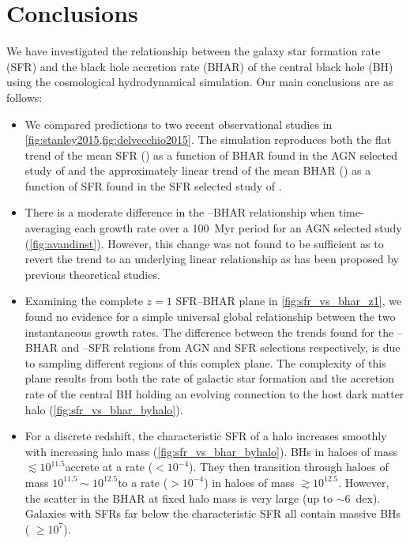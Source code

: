 \section{Conclusions}
\label{sect:conclusions}

We have investigated the relationship between the galaxy star formation rate
(SFR) and the black hole accretion rate (BHAR) of the central black hole (BH)
using the \eagle cosmological hydrodynamical simulation. Our main conclusions
are as follows: 

\begin{itemize}

\item We compared \eagle predictions to two recent observational studies in
\cref{fig:stanley2015,fig:delvecchio2015}. The simulation reproduces both the
flat trend of the mean SFR () as a function of BHAR found in the AGN
selected study of \citet{Stanley2015} and the approximately linear trend of the
mean BHAR () as a function of SFR found in the SFR selected study of
\citet{Delvecchio2015}. 

\item There is a moderate difference in the --BHAR relationship when
time-averaging each growth rate over a 100~Myr period for an AGN selected study
(\cref{fig:avandinst}).  However, this change was not found to be sufficient as
to revert the trend to an underlying linear relationship as has been proposed by
previous theoretical studies.

\item Examining the complete $z=1$ SFR--BHAR plane in
\cref{fig:sfr_vs_bhar_z1}, we found no evidence for a simple universal global
relationship between the two instantaneous growth rates. The difference between
the trends found for the --BHAR and --SFR relations from AGN
and SFR selections respectively, is due to sampling different regions of this
complex plane. The complexity of this plane results from both the rate of
galactic star formation and the accretion rate of the central BH holding an
evolving connection to the host dark matter halo
(\cref{fig:sfr_vs_bhar_byhalo}).

\item For a discrete redshift, the characteristic SFR of a halo increases
smoothly with increasing halo mass (\cref{fig:sfr_vs_bhar_byhalo}). BHs in
haloes of mass  $\lesssim 10^{11.5}$\Msol accrete at a 
rate (\BHAR $< 10^{-4}$\Msolyr).  They then transition through haloes of mass
$10^{11.5} \sim 10^{12.5}$\Msol to a  rate (\BHAR $>
10^{-4}$\Msolyr) in haloes of mass  $\gtrsim 10^{12.5}$\Msol. However,
the scatter in the BHAR at fixed halo mass is very large (up to $\sim 6$~dex).
Galaxies with SFRs far below the characteristic SFR all contain massive BHs
( $\geq 10^{7}$\Msol).  


\end{itemize}
